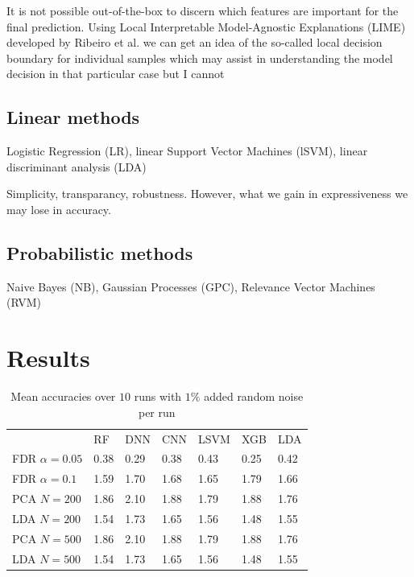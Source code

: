 \documentclass[a4paper,10pt]{article}
\begin{document}
It is not possible out-of-the-box to discern which features are important for the final prediction. 
Using Local Interpretable Model-Agnostic Explanations (LIME) developed by Ribeiro et al.\cite{Ribeiro2016} 
we can get an idea of the so-called local decision boundary for individual samples which may assist in
understanding the model decision in that particular case but I cannot 
%
\subsection{Linear methods}

Logistic Regression (LR), 
linear Support Vector Machines (lSVM), 
linear discriminant analysis (LDA)

Simplicity, transparancy, robustness. However, what we gain in expressiveness we may lose in accuracy.

\subsection{Probabilistic methods}
%
Naive Bayes (NB), Gaussian Processes (GPC), Relevance Vector Machines (RVM)


\section{Results}
% 
\begin{table}[htp]
\centering
\caption{Mean accuracies over $10$ runs with $1\%$ added random noise per run}
\label{tab:diversitymetrics}
\begin{tabular}{lllllll}
				& RF     & DNN 		& CNN  		& LSVM 		& 	XGB 	& 	LDA  \\
FDR $\alpha=0.05$		& 0.38   &  0.29      	&  0.38     	&  0.43    	& 0.25    	& 0.42  \\
FDR $\alpha=0.1$ 		& 1.59   &  1.70      	&  1.68 	&  1.65    	& 1.79    	& 1.66  \\
PCA $N=200$    			& 1.86   &  2.10      	&  1.88         &  1.79    	& 1.88          & 1.76  \\
LDA $N=200$        		& 1.54   &  1.73      	&  1.65         &  1.56    	& 1.48          & 1.55  \\
PCA $N=500$    			& 1.86   &  2.10      	&  1.88         &  1.79    	& 1.88          & 1.76  \\
LDA $N=500$        		& 1.54   &  1.73      	&  1.65         &  1.56    	& 1.48          & 1.55  \\
\end{tabular}
\end{table}
%
\end{document}
